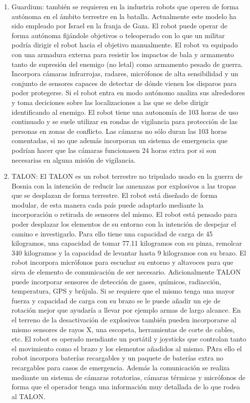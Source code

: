 \begin{enumerate}
  \item Guardium: también se requieren en la industria robots que operen de forma autónoma en el ámbito terrestre en la batalla. Actualmente este modelo ha sido empleado por Israel en la franja de Gaza. El robot puede operar de forma autónoma fijándole objetivos o teleoperado con lo que un militar podría dirigir el robot hacia el objetivo manualmente. El robot va equipado con una armadura externa para resistir los impactos de bala y armamento tanto de supresión del enemigo (no letal) como armamento pesado de guerra. Incorpora cámaras infrarrojas, radares, micrófonos de alta sensibilidad y un conjunto de sensores capaces de detectar de dónde vienen los disparos para poder protegerse. Si el robot entra en modo autónomo analiza sus alrededores y toma deciciones sobre las localizaciones a las que se debe dirigir identificando al enemigo. El robot tiene una autonomía de 103 horas de uso continuado y se suele utilizar en rondas de vigilancia para protección de las personas en zonas de conflicto. Las cámaras no sólo duran las 103 horas comentadas, si no que además incorporan un sistema de emergencia que podrían hacer que las cámaras funcionasen 24 horas extra por si son necesarias en alguna misión de vigilancia.
  \item TALON: El TALON es un robot terrestre no tripulado usado en la guerra de Bosnia con la intención de reducir las amenazas por explosivos a las tropas que se desplazan de forma terrestre. El robot está diseñado de forma modular, de esta manera cada país puede adaptarlo mediante la incorporación o retirada de sensores del mismo. El robot está pensado para poder desplazar los elementos de su entorno con la intención de despejar el camino e investigarlo. Para ello tiene una capacidad de carga de 45 kilogramos, una capacidad de tomar 77.11 kilogramos con su pinza, remolcar 340 kilogramos y la capacidad de levantar hasta 9 kilogramos con su brazo. El robot incorpora micrófonos para escuchar su entorno y altavoces para que sirva de elemento de comunicación de ser necesario. Adicionalmente TALON puede incorporar sensores de detección de gases, químicos, radiacción, temperatura, GPS y brújula. Si se requiere que el mismo tenga una mayor fuerza y capacidad de carga con su brazo se le puede añadir un eje de rotación mejor que ayudaría a llevar por ejemplo armas de largo alcance. En el terreno de la desactivación de explosivos también pueden incorporarse al mismo sensores de rayos X, una escopeta, herramientas de corte de cables, etc. El robot es operado mendiante un portátil y joysticks que controlan tanto el movimiento como el brazo y los elementos añadidos al mismo. PAra ello el robot incorpora baterías recargables y un paquete de baterías extra no recargables para casos de emergencia. Además la comunicación se realiza mediante un sistema de cámaras rotatorias, cámaras térmicas y micrófonos de forma que el operador tenga una información muy detallada de lo que rodea al TALON.

\end{enumerate}
